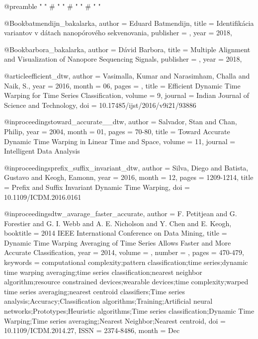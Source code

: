 @preamble{ "\newcommand{\noopsort}[1]{} "
	# "\newcommand{\printfirst}[2]{#1} "
	# "\newcommand{\singleletter}[1]{#1} "
	# "\newcommand{\switchargs}[2]{#2#1} " }

@Book{batmendijn_bakalarka,
    author = {Eduard Batmendijn},
    title = {Identifikácia variantov v dátach nanopórového sekvenovania},
    publisher = {},
    year = {2018},
}

@Book{barbora_bakalarka,
    author = {Dávid Barbora},
    title = {Multiple Alignment and Visualization of Nanopore Sequencing Signals},
    publisher = {},
    year = {2018},
}

@article{efficient_dtw,
  author = {Vasimalla, Kumar and Narasimham, Challa and Naik, S.},
  year = {2016},
  month = {06},
  pages = {},
  title = {Efficient Dynamic Time Warping for Time Series Classification},
  volume = {9},
  journal = {Indian Journal of Science and Technology},
  doi = {10.17485/ijst/2016/v9i21/93886}
}

@inproceedings{toward_accurate__dtw,
  author = {Salvador, Stan and Chan, Philip},
  year = {2004},
  month = {01},
  pages = {70-80},
  title = {Toward Accurate Dynamic Time Warping in Linear Time and Space},
  volume = {11},
  journal = {Intelligent Data Analysis}
}

@inproceedings{prefix_suffix_invariant_dtw,
  author = {Silva, Diego and Batista, Gustavo and Keogh, Eamonn},
  year = {2016},
  month = {12},
  pages = {1209-1214},
  title = {Prefix and Suffix Invariant Dynamic Time Warping},
  doi = {10.1109/ICDM.2016.0161}
}

@inproceedings{dtw_avarage_faster_accurate,
  author = {F. {Petitjean} and G. {Forestier} and G. I. {Webb} and A. E. {Nicholson} and Y. {Chen} and E. {Keogh}},
  booktitle = {2014 IEEE International Conference on Data Mining},
  title = {Dynamic Time Warping Averaging of Time Series Allows Faster and More Accurate Classification},
  year = {2014},
  volume = {},
  number = {},
  pages = {470-479},
  keywords = {computational complexity;pattern classification;time series;dynamic time warping averaging;time series classification;nearest neighbor algorithm;resource constrained devices;wearable devices;time complexity;warped time series averaging;nearest centroid classifiers;Time series analysis;Accuracy;Classification algorithms;Training;Artificial neural networks;Prototypes;Heuristic algorithms;Time series classification;Dynamic Time Warping;Time series averaging;Nearest Neighbor;Nearest centroid},
  doi = {10.1109/ICDM.2014.27},
  ISSN = {2374-8486},
  month = {Dec}
}

